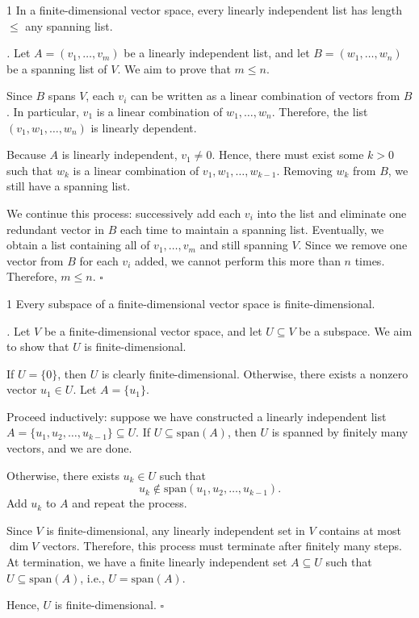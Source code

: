 \documentclass[11pt]{article}
\renewenvironment{proof}[1][\proofname]{\par\noindent\textit{#1.} }{\hfill$\square$\par}
\begin{document}
\begin{theorem}{}{1}
In a finite-dimensional vector space, every linearly independent list has length $\leq$ any spanning list.
\end{theorem}
\begin{proof}
Let $A = (v_1, \dots, v_m)$ be a linearly independent list, and let $B = (w_1, \dots, w_n)$ be a spanning list of $V$. We aim to prove that $m \leq n$.

 Since $B$ spans $V$, each $v_i$ can be written as a linear combination of vectors from $B$. In particular, $v_1$ is a linear combination of $w_1, \dots, w_n$. Therefore, the list $(v_1, w_1, \dots, w_n)$ is linearly dependent.
 
 Because $A$ is linearly independent, $v_1 \neq 0$. Hence, there must exist some $k > 0$ such that $w_k$ is a linear combination of $v_1, w_1, \dots, w_{k-1}$. Removing $w_k$ from $B$, we still have a spanning list.
 
 We continue this process: successively add each $v_i$ into the list and eliminate one redundant vector in $B$ each time to maintain a spanning list. Eventually, we obtain a list containing all of $v_1, \dots, v_m$ and still spanning $V$. Since we remove one vector from $B$ for each $v_i$ added, we cannot perform this more than $n$ times. Therefore, $m \leq n$.
\end{proof}

\begin{theorem}{}{1}
Every subspace of a finite-dimensional vector space is finite-dimensional.
\end{theorem}
\begin{proof}
 Let $V$ be a finite-dimensional vector space, and let $U \subseteq V$ be a subspace.  
 We aim to show that $U$ is finite-dimensional.
 
 If $U = \{0\}$, then $U$ is clearly finite-dimensional.  
 Otherwise, there exists a nonzero vector $u_1 \in U$.  
 Let $A = \{u_1\}$.
 
 Proceed inductively: suppose we have constructed a linearly independent list $A = \{u_1, u_2, \dots, u_{k-1}\} \subseteq U$.  
 If $U \subseteq \mathrm{span}(A)$, then $U$ is spanned by finitely many vectors, and we are done.
 
 Otherwise, there exists $u_k \in U$ such that  
 $$
 u_k \notin \mathrm{span}(u_1, u_2, \dots, u_{k-1}).
 $$  
 Add $u_k$ to $A$ and repeat the process.
 
 Since $V$ is finite-dimensional, any linearly independent set in $V$ contains at most $\dim V$ vectors.  
 Therefore, this process must terminate after finitely many steps.  
 At termination, we have a finite linearly independent set $A \subseteq U$ such that $U \subseteq \mathrm{span}(A)$,  
 i.e., $U = \mathrm{span}(A)$.
 
 Hence, $U$ is finite-dimensional. 
\end{proof}
\end{document}
